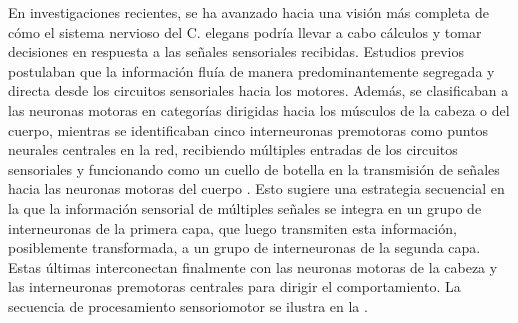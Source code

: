 En investigaciones recientes, se ha avanzado hacia una visión más completa de cómo el sistema nervioso del C. elegans podría llevar a cabo cálculos y tomar decisiones en respuesta a las señales sensoriales recibidas. Estudios previos postulaban que la información fluía de manera predominantemente segregada y directa desde los circuitos sensoriales hacia los motores. Además, se clasificaban a las neuronas motoras en categorías dirigidas hacia los músculos de la cabeza o del cuerpo, mientras se identificaban cinco interneuronas premotoras como puntos neurales centrales en la red, recibiendo múltiples entradas de los circuitos sensoriales y funcionando como un cuello de botella en la transmisión de señales hacia las neuronas motoras del cuerpo  \cite{gray_circuit_2005} .  Esto sugiere una estrategia secuencial en la que la información sensorial de múltiples señales se integra en un grupo de interneuronas de la primera capa, que luego transmiten esta información, posiblemente transformada, a un grupo de interneuronas de la segunda capa. Estas últimas interconectan finalmente con las neuronas motoras de la cabeza y las interneuronas premotoras centrales para dirigir el comportamiento. La secuencia de procesamiento sensoriomotor se ilustra en la .


